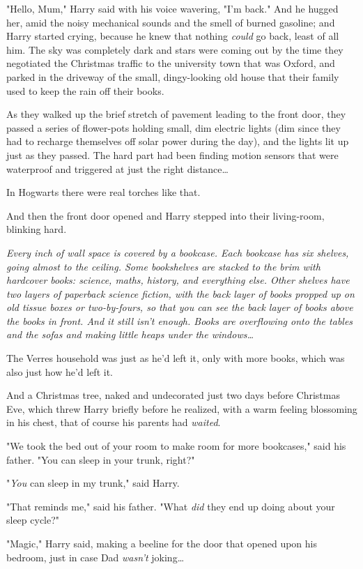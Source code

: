 "Hello, Mum," Harry said with his voice wavering, "I'm back." And he hugged
her, amid the noisy mechanical sounds and the smell of burned gasoline; and
Harry started crying, because he knew that nothing \emph{could} go back, least
of all him.
\later
The sky was completely dark and stars were coming out by the time they
negotiated the Christmas traffic to the university town that was Oxford, and
parked in the driveway of the small, dingy-looking old house that their family
used to keep the rain off their books.

As they walked up the brief stretch of pavement leading to the front door, they
passed a series of flower-pots holding small, dim electric lights (dim since
they had to recharge themselves off solar power during the day), and the lights
lit up just as they passed. The hard part had been finding motion sensors that
were waterproof and triggered at just the right distance{\ldots}

In Hogwarts there were real torches like that.

And then the front door opened and Harry stepped into their living-room,
blinking hard.

\emph{Every inch of wall space is covered by a bookcase. Each bookcase has six
shelves, going almost to the ceiling. Some bookshelves are stacked to the brim
with hardcover books: science, maths, history, and everything else. Other
shelves have two layers of paperback science fiction, with the back layer of
books propped up on old tissue boxes or two-by-fours, so that you can see the
back layer of books above the books in front. And it still isn't enough. Books
are overflowing onto the tables and the sofas and making little heaps under the
windows{\ldots}}

The Verres household was just as he'd left it, only with more books, which was
also just how he'd left it.

And a Christmas tree, naked and undecorated just two days before Christmas Eve,
which threw Harry briefly before he realized, with a warm feeling blossoming in
his chest, that of course his parents had \emph{waited}.

"We took the bed out of your room to make room for more bookcases," said his
father. "You can sleep in your trunk, right?"

"\emph{You} can sleep in my trunk," said Harry.

"That reminds me," said his father. "What \emph{did} they end up doing about
your sleep cycle?"

"Magic," Harry said, making a beeline for the door that opened upon his
bedroom, just in case Dad \emph{wasn't} joking{\ldots}

